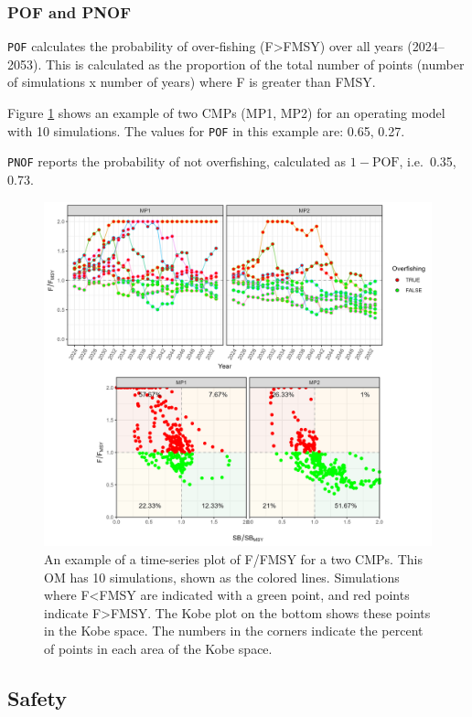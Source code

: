 \documentclass[
]{article}
\begin{document}
\hypertarget{pof-and-pnof}{%
\subsubsection{POF and PNOF}\label{pof-and-pnof}}

\texttt{POF} calculates the probability of over-fishing (F\textgreater FMSY) over all years (2024--2053). This is calculated as the proportion of the total number of points (number of simulations x number of years) where F is greater than FMSY.

Figure \ref{fig:POF} shows an example of two CMPs (MP1, MP2) for an operating model with 10 simulations. The values for \texttt{POF} in this example are: 0.65, 0.27.

\texttt{PNOF} reports the probability of not overfishing, calculated as \(1-\text{POF}\), i.e.~0.35, 0.73.

\begin{figure}
\includegraphics[width=37.5in]{../../img/PMs/POF} \caption{An example of a time-series plot of F/FMSY for a two CMPs. This OM has 10 simulations, shown as the colored lines. Simulations where F<FMSY are indicated with a green point, and red points indicate F>FMSY. The Kobe plot on the bottom shows these points in the Kobe space. The numbers in the corners indicate the percent of points in each area of the Kobe space.}\label{fig:POF}
\end{figure}

\hypertarget{safety}{%
\subsection{Safety}\label{safety}}
\end{document}
